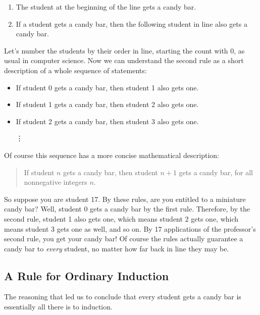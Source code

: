 \begin{enumerate}
\item The student at the beginning of the line gets a candy bar.
\item If a student gets a candy bar, then the following student in line
  also gets a candy bar.
\end{enumerate}
%
Let's number the students by their order in line, starting the count with
0, as usual in computer science.  Now we can understand the second rule as
a short description of a whole sequence of statements:
%
\begin{itemize}
\item If student 0 gets a candy bar, then student 1 also gets one.
\item If student 1 gets a candy bar, then student 2 also gets one.
\item If student 2 gets a candy bar, then student 3 also gets one.

\hspace{1.2in} \vdots
\end{itemize}
%
Of course this sequence has a more concise mathematical description:
\begin{quote}
  If student $n$ gets a candy bar, then student $n+1$ gets a
  candy bar, for all nonnegative integers $n$.
\end{quote}
So suppose you are student 17.  By these rules, are you entitled to a
miniature candy bar?  Well, student 0 gets a candy bar by the first rule.
Therefore, by the second rule, student 1 also gets one, which means
student 2 gets one, which means student 3 gets one as well, and so on.  By
17 applications of the professor's second rule, you get your candy bar!
Of course the rules actually guarantee a candy bar to \emph{every}
student, no matter how far back in line they may be.


\subsection{A Rule for Ordinary Induction}

The reasoning that led us to conclude that every student gets a candy bar is 
essentially all there is to induction.
\iffalse
So our claim that all the Professor's students get a candy bar was simply
an application of the Induction Rule with $P(n)$ defined to be the
predicate, ``student $n$ gets a candy bar.''
\fi

